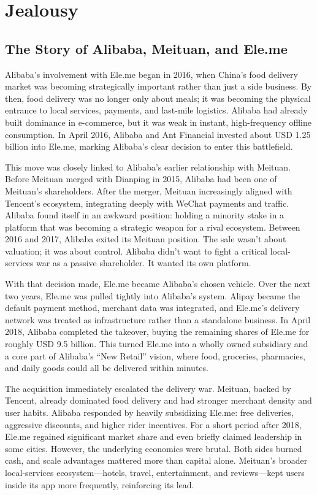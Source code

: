 \chapter{Jealousy}

\section{The Story of Alibaba, Meituan, and Ele.me}

Alibaba's involvement with Ele.me began in 2016, when China's food delivery market was becoming strategically important rather than just a side business. By then, food delivery was no longer only about meals; it was becoming the physical entrance to local services, payments, and last-mile logistics. Alibaba had already built dominance in e-commerce, but it was weak in instant, high-frequency offline consumption. In April 2016, Alibaba and Ant Financial invested about USD 1.25 billion into Ele.me, marking Alibaba's clear decision to enter this battlefield.

This move was closely linked to Alibaba's earlier relationship with Meituan. Before Meituan merged with Dianping in 2015, Alibaba had been one of Meituan's shareholders. After the merger, Meituan increasingly aligned with Tencent's ecosystem, integrating deeply with WeChat payments and traffic. Alibaba found itself in an awkward position: holding a minority stake in a platform that was becoming a strategic weapon for a rival ecosystem. Between 2016 and 2017, Alibaba exited its Meituan position. The sale wasn't about valuation; it was about control. Alibaba didn't want to fight a critical local-services war as a passive shareholder. It wanted its own platform.

With that decision made, Ele.me became Alibaba's chosen vehicle. Over the next two years, Ele.me was pulled tightly into Alibaba's system. Alipay became the default payment method, merchant data was integrated, and Ele.me's delivery network was treated as infrastructure rather than a standalone business. In April 2018, Alibaba completed the takeover, buying the remaining shares of Ele.me for roughly USD 9.5 billion. This turned Ele.me into a wholly owned subsidiary and a core part of Alibaba's ``New Retail'' vision, where food, groceries, pharmacies, and daily goods could all be delivered within minutes.

The acquisition immediately escalated the delivery war. Meituan, backed by Tencent, already dominated food delivery and had stronger merchant density and user habits. Alibaba responded by heavily subsidizing Ele.me: free deliveries, aggressive discounts, and higher rider incentives. For a short period after 2018, Ele.me regained significant market share and even briefly claimed leadership in some cities. However, the underlying economics were brutal. Both sides burned cash, and scale advantages mattered more than capital alone. Meituan’s broader local-services ecosystem—hotels, travel, entertainment, and reviews—kept users inside its app more frequently, reinforcing its lead.

